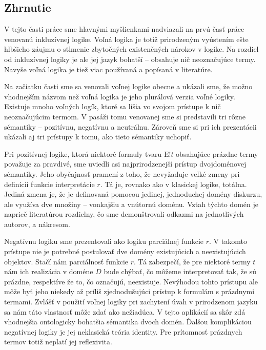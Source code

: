 \documentclass[12pt, letterpaper]{article}
\begin{document}
\subsection{Zhrnutie}
V tejto časti práce sme hlavnými myšlienkami nadviazali na prvú časť práce venovanú inkluzívnej logike. Voľná logika je totiž prirodzeným vyústením ešte hlbšieho záujmu o stlmenie zbytočných existenčných nárokov v logike. Na rozdiel od inkluzívnej logiky je ale jej jazyk bohatší -- obsahuje nič neoznačujúce termy. Navyše voľná logika je tiež viac používaná a popísaná v literatúre.\par
Na začiatku časti sme sa venovali voľnej logike obecne a ukázali sme, že možno vhodnejším názvom než voľná logika je jeho plurálová verzia voľné logiky. Existuje mnoho voľných logík, ktoré sa líšia vo svojom prístupe k nič neoznačujúcim termom. V pasáži tomu venovanej sme si predstavili tri rôzne sémantiky -- pozitívnu, negatívnu a neutrálnu. Zároveň sme si pri ich prezentácii ukázali aj tri prístupy k tomu, ako tieto sémantiky uchopiť.\par 
Pri pozitívnej logike, ktorá niektoré formuly tvaru $\text{E}!t$ obsahujúce prázdne termy považuje za pravdivé, sme uviedli asi najprirodzenejší prístup dvojdoménovej sémantiky. Jeho obyčajnosť pramení z toho, že nevyžaduje veľké zmeny pri definícii funkcie interpretácie $r$. Tá je, rovnako ako v klasickej logike, totálna. Jediná zmena je, že je definovaná pomocou jedinej, jednoduchej domény diskurzu, ale využíva dve množiny -- vonkajšiu a vnútornú doménu. Vzťah týchto domén je naprieč literatúrou rozdielny, čo sme demonštrovali odkazmi na jednotlivých autorov, a nákresom.\par
Negatívnu logiku sme prezentovali ako logiku parciálnej funkcie $r$. V takomto prístupe nie je potrebné postulovať dve domény existujúcich a neexistujúcich objektov. Stačí nám parciálnosť funkcie $r$. Tá zabezpečí, že pre niektoré termy $t$ nám ich realizácia v doméne $D$ bude chýbať, čo môžeme interpretovať tak, že sú prázdne, respektíve že to, čo označujú, neexistuje. Nevýhodou tohto prístupu ale môže byť jeho niekedy až príliš zjednodušujúci prístup k formulám s prázdnymi termami. Zvlášť v použití voľnej logiky pri zachytení úvah v prirodzenom jazyku sa nám táto vlastnosť môže zdať ako nežiadúca. V tejto aplikácií sa skôr zdá vhodnejšia ontologicky bohatšia sémantika dvoch domén. Ďalšou komplikáciou negatívnej logiky je jej neklasická teória identity. Pre prítomnosť prázdnych termov totiž neplatí jej reflexivita.\par
\end{document}
